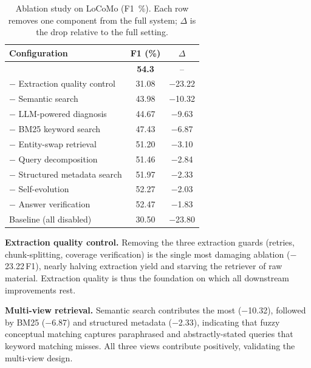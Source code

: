\begin{table}
\centering
\small
\vspace{-0.5em}
\caption{Ablation study on LoCoMo (F1~\%). Each row removes one component from the full system; $\Delta$ is the drop relative to the full setting.}
\label{tab:ablation}
\vspace{-0.4em}
\setlength{\tabcolsep}{4pt}
\begin{tabular}{@{}lcc@{}}
\toprule
\textbf{Configuration} & \textbf{F1 (\%)} & \textbf{$\Delta$} \\
\midrule
\ours{}                                                   & \textbf{54.3} & -- \\
\midrule
$-$ Extraction quality control                            & 31.08 & $-$23.22 \\
$-$ Semantic search                                       & 43.98 & $-$10.32 \\
$-$ LLM-powered diagnosis                                 & 44.67 & $-$9.63 \\
$-$ BM25 keyword search                                   & 47.43 & $-$6.87 \\
$-$ Entity-swap retrieval                                 & 51.20 & $-$3.10 \\
$-$ Query decomposition                                   & 51.46 & $-$2.84 \\
$-$ Structured metadata search                            & 51.97 & $-$2.33 \\
$-$ Self-evolution                                        & 52.27 & $-$2.03 \\
$-$ Answer verification                                   & 52.47 & $-$1.83 \\
\midrule
Baseline (all disabled)                                   & 30.50 & $-$23.80 \\
\bottomrule
\end{tabular}
\vspace{-2.0em}
\end{table}


\noindent \textbf{Extraction quality control.} Removing the three extraction guards (retries, chunk-splitting, coverage
  verification) is the single most damaging ablation ($-$23.22\,F1), nearly halving extraction yield and starving the
  retriever of raw material. Extraction quality is thus the foundation on which all downstream improvements rest.  
  
  \noindent \textbf{Multi-view retrieval.} Semantic search contributes the most ($-$10.32), followed by BM25 ($-$6.87) and   
  structured metadata ($-$2.33), indicating that fuzzy conceptual matching captures paraphrased and abstractly-stated
  queries that keyword matching misses. All three views contribute positively, validating the multi-view design. 
  
